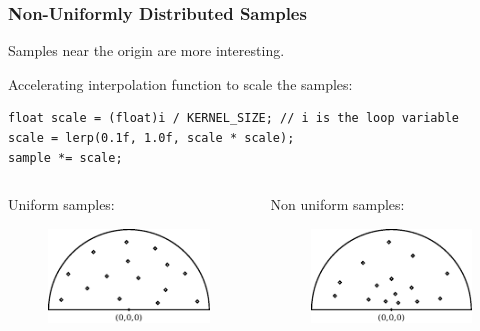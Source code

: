 \documentclass{beamer}
\newcommand{\redtext}[1]{\textcolor{myred}{#1}}
\begin{document}
\begin{frame}[fragile]
\frametitle{Non-Uniformly Distributed Samples}
Samples near the origin are more interesting.

\redtext{Accelerating interpolation function} to scale the samples:
\begin{verbatim}
float scale = (float)i / KERNEL_SIZE; // i is the loop variable
scale = lerp(0.1f, 1.0f, scale * scale);
sample *= scale;
\end{verbatim}

\vspace{0.3cm}

\begin{columns}
    \begin{column}{0.45\linewidth}
        \centering
        Uniform samples:
        \begin{figure}
            \centering
            \vspace{-1.8ex}%
            \includegraphics[width=0.7\linewidth]{images/sample_kernel_uniform.pdf}
        \end{figure}
    \end{column}
    
    \begin{column}{0.45\linewidth}
        \centering
        \redtext{Non uniform samples}:
        \begin{figure}
            \centering
            \vspace{-1.8ex}%
            \includegraphics[width=0.7\linewidth]{images/sample_kernel_accel.pdf}
        \end{figure}
        
    \end{column}
\end{columns}

\end{frame}
\end{document}
